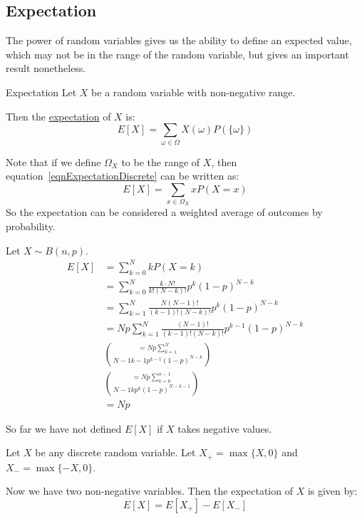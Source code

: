 \documentclass[../Main.tex]{subfiles}
\begin{document}
\subsection{Expectation}
The power of random variables gives us the ability to define an expected value, which may not be in the range of the random variable, but gives an important result nonetheless.
\begin{definition}{Expectation}
    Let $X$ be a random variable with non-negative range.\par
    Then the \underline{expectation} of $X$ is:
    \begin{equation}
        E[X] = \sum_{\omega \in \Omega} X(\omega) P(\{\omega\})
        \label{eqnExpectationDiscrete}
    \end{equation}
\end{definition}
Note that if we define $\Omega_X$ to be the range of $X$, then equation~\ref{eqnExpectationDiscrete} can be written as:
\begin{equation*}
    E[X] = \sum_{x \in \Omega_X} x P(X = x)
\end{equation*}
So the expectation can be considered a weighted average of outcomes by probability.
\begin{example}
    Let $X \sim B(n, p)$.
    \begin{align*}
    E[X] &= \sum_{k=0}^N k P(X = k) \\
    &= \sum_{k=0}^N \frac{k \cdot N!}{k! (N-k)!} p^k (1-p)^{N-k} \\
    &= \sum_{k=1}^N \frac{N (N-1)!}{(k-1)!(N-k)!} p^k (1-p)^{N-k} \\
    &= Np \sum_{k=1}^N \frac{(N-1)!}{(k-1)!(N-k)!} p^{k-1} (1-p)^{N-k} \\
    &= Np \sum_{k=1}^N \choose{N-1}{k-1} p^{k-1} (1-p)^{N-k} \\
    &= Np \sum_{k=0}^{n-1} \choose{N-1}{k} p^k (1-p)^{N-k-1} \\
    &= Np
    \end{align*}
\end{example}
So far we have not defined $E[X]$ if $X$ takes negative values.\par
Let $X$ be any discrete random variable. Let $X_+ = \max{\{X, 0\}}$ and $X_- = \max{\{-X, 0\}}$.\par
Now we have two non-negative variables. Then the expectation of $X$ is given by:
\begin{equation}
    E[X] = E[X_+] - E[X_-]
    \label{eqnExpectationNegativeDiscrete}
\end{equation}
\end{document}
